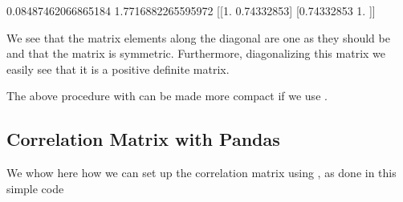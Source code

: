 \documentclass[letterpaper,10pt,english]{sphinxmanual}
\begin{document}
\begin{sphinxVerbatim}[commandchars=\\\{\}]
0.08487462066865184
1.7716882265595972
[[1.         0.74332853]
 [0.74332853 1.        ]]
\end{sphinxVerbatim}

We see that the matrix elements along the diagonal are one as they
should be and that the matrix is symmetric. Furthermore, diagonalizing
this matrix we easily see that it is a positive definite matrix.

The above procedure with  can be made more compact if we use .


\subsection{Correlation Matrix with Pandas}
\label{\detokenize{chapter4:correlation-matrix-with-pandas}}
We whow here how we can set up the correlation matrix using , as done in this simple code

\begin{sphinxVerbatim}[commandchars=\\\{\}]
   
   
  
  
    
  
    
   
  
  
\end{sphinxVerbatim}
\end{document}
